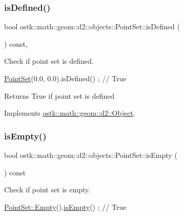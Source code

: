 \subsubsection{\texorpdfstring{is\+Defined()}{isDefined()}}
{\footnotesize\ttfamily bool ostk\+::math\+::geom\+::d2\+::objects\+::\+Point\+Set\+::is\+Defined (\begin{DoxyParamCaption}{ }\end{DoxyParamCaption}) const\hspace{0.3cm}{\ttfamily [override]}, {\ttfamily [virtual]}}



Check if point set is defined. 


\begin{DoxyCode}
\hyperlink{classostk_1_1math_1_1geom_1_1d2_1_1objects_1_1_point_set_a736eff7b0d1c876b304bfa7d1d2d0095}{PointSet}(0.0, 0.0).isDefined() ; \textcolor{comment}{// True}
\end{DoxyCode}


\begin{DoxyReturn}{Returns}
True if point set is defined 
\end{DoxyReturn}


Implements \hyperlink{classostk_1_1math_1_1geom_1_1d2_1_1_object_a456cc7121218d24c1322d0fe54230cc4}{ostk\+::math\+::geom\+::d2\+::\+Object}.

\mbox{\label{classostk_1_1math_1_1geom_1_1d2_1_1objects_1_1_point_set_a1df6b975efcbfc495dbdc947dc632846}} 
\subsubsection{\texorpdfstring{is\+Empty()}{isEmpty()}}
{\footnotesize\ttfamily bool ostk\+::math\+::geom\+::d2\+::objects\+::\+Point\+Set\+::is\+Empty (\begin{DoxyParamCaption}{ }\end{DoxyParamCaption}) const}



Check if point set is empty. 


\begin{DoxyCode}
\hyperlink{classostk_1_1math_1_1geom_1_1d2_1_1objects_1_1_point_set_a09f5e125c7b4545a75e4eea6193bf615}{PointSet::Empty}().\hyperlink{classostk_1_1math_1_1geom_1_1d2_1_1objects_1_1_point_set_a1df6b975efcbfc495dbdc947dc632846}{isEmpty}() ; \textcolor{comment}{// True}
\end{DoxyCode}


